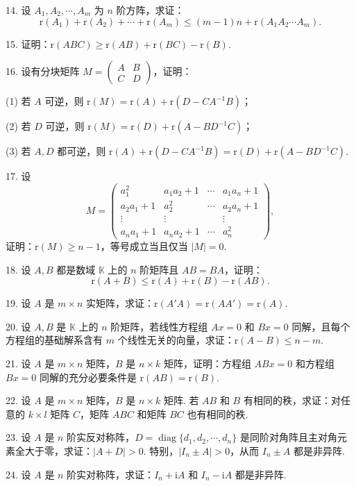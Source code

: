 \documentclass[UTF8,12pt,a4paper,fontset=fandol]{ctexart}
\begin{document}
14. 设 $A_1,A_2,\cdots,A_m$ 为 $n$ 阶方阵，求证：
\[
\mathrm{r}(A_1)+\mathrm{r}(A_2)+\cdots+\mathrm{r}(A_m)\leq (m-1)n+\mathrm{r}(A_1A_2\cdots A_m).
\]

15. 证明：$\mathrm{r}(ABC)\geq \mathrm{r}(AB)+\mathrm{r}(BC)-\mathrm{r}(B)$.

16. 设有分块矩阵 $M=\left(\begin{array}{cc}A&B\\ C&D\end{array}\right)$，证明：

(1) 若 $A$ 可逆，则 $\mathrm{r}(M)=\mathrm{r}(A)+\mathrm{r}(D-CA^{-1}B)$；

(2) 若 $D$ 可逆，则 $\mathrm{r}(M)=\mathrm{r}(D)+\mathrm{r}(A-BD^{-1}C)$；

(3) 若 $A,D$ 都可逆，则 $\mathrm{r}(A)+\mathrm{r}(D-CA^{-1}B)=\mathrm{r}(D)+\mathrm{r}(A-BD^{-1}C)$.

17. 设
\[
M=\left(\begin{array}{cccc}
a_1^2&a_1a_2+1&\cdots&a_1a_n+1\\
a_2a_1+1&a_2^2&\cdots&a_2a_n+1\\
\vdots&\vdots&&\vdots\\
a_na_1+1&a_na_2+1&\cdots&a_n^2
\end{array}\right),
\]
证明：$\mathrm{r}(M)\geq n-1$，等号成立当且仅当 $|M|=0$.

18. 设 $A,B$ 都是数域 $\mathbb{K}$ 上的 $n$ 阶矩阵且 $AB=BA$，证明：
\[
\mathrm{r}(A+B)\leq \mathrm{r}(A)+\mathrm{r}(B)-\mathrm{r}(AB).
\]

19. 设 $A$ 是 $m\times n$ 实矩阵，求证：$\mathrm{r}(A'A)=\mathrm{r}(AA')=\mathrm{r}(A)$.

20. 设 $A,B$ 是 $\mathbb{K}$ 上的 $n$ 阶矩阵，若线性方程组 $Ax=0$ 和 $Bx=0$ 同解，且每个方程组的基础解系含有 $m$ 个线性无关的向量，求证：$\mathrm{r}(A-B)\leq n-m$.

21. 设 $A$ 是 $m\times n$ 矩阵，$B$ 是 $n\times k$ 矩阵，证明：方程组 $ABx=0$ 和方程组 $Bx=0$ 同解的充分必要条件是 $\mathrm{r}(AB)=\mathrm{r}(B)$.

22. 设 $A$ 是 $m\times n$ 矩阵，$B$ 是 $n\times k$ 矩阵. 若 $AB$ 和 $B$ 有相同的秩，求证：对任意的 $k\times l$ 矩阵 $C$，矩阵 $ABC$ 和矩阵 $BC$ 也有相同的秩.

23. 设 $A$ 是 $n$ 阶实反对称阵，$D=\operatorname{diag}\{d_1,d_2,\cdots,d_n\}$ 是同阶对角阵且主对角元素全大于零，求证：$|A+D|>0$. 特别，$|I_n\pm A|>0$，从而 $I_n\pm A$ 都是非异阵.

24. 设 $A$ 是 $n$ 阶实对称阵，求证：$I_n+\mathrm{i}A$ 和 $I_n-\mathrm{i}A$ 都是非异阵.
\end{document}
